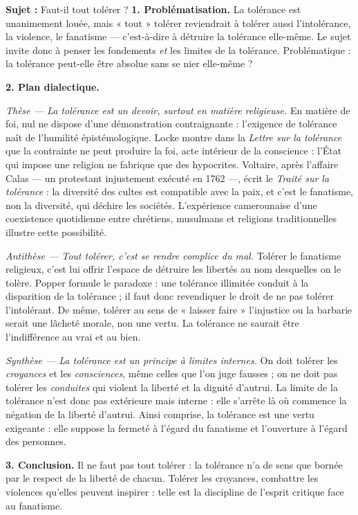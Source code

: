 \documentclass[11pt]{article}
\begin{document}
\begin{exoresolu}
\textbf{Sujet :} Faut-il tout tolérer ?
\tcblower
\textbf{1. Problématisation.} La tolérance est unanimement louée, mais « tout » tolérer reviendrait à tolérer aussi l'intolérance, la violence, le fanatisme — c'est-à-dire à détruire la tolérance elle-même. Le sujet invite donc à penser les fondements \emph{et} les limites de la tolérance. Problématique : la tolérance peut-elle être absolue sans se nier elle-même ?

\textbf{2. Plan dialectique.}

\emph{Thèse — La tolérance est un devoir, surtout en matière religieuse.} En matière de foi, nul ne dispose d'une démonstration contraignante : l'exigence de tolérance naît de l'humilité épistémologique. Locke montre dans la \emph{Lettre sur la tolérance} que la contrainte ne peut produire la foi, acte intérieur de la conscience : l'État qui impose une religion ne fabrique que des hypocrites. Voltaire, après l'affaire Calas — un protestant injustement exécuté en 1762 —, écrit le \emph{Traité sur la tolérance} : la diversité des cultes est compatible avec la paix, et c'est le fanatisme, non la diversité, qui déchire les sociétés. L'expérience camerounaise d'une coexistence quotidienne entre chrétiens, musulmans et religions traditionnelles illustre cette possibilité.

\emph{Antithèse — Tout tolérer, c'est se rendre complice du mal.} Tolérer le fanatisme religieux, c'est lui offrir l'espace de détruire les libertés au nom desquelles on le tolère. Popper formule le paradoxe : une tolérance illimitée conduit à la disparition de la tolérance ; il faut donc revendiquer le droit de ne pas tolérer l'intolérant. De même, tolérer au sens de « laisser faire » l'injustice ou la barbarie serait une lâcheté morale, non une vertu. La tolérance ne saurait être l'indifférence au vrai et au bien.

\emph{Synthèse — La tolérance est un principe à limites internes.} On doit tolérer les \emph{croyances} et les \emph{consciences}, même celles que l'on juge fausses ; on ne doit pas tolérer les \emph{conduites} qui violent la liberté et la dignité d'autrui. La limite de la tolérance n'est donc pas extérieure mais interne : elle s'arrête là où commence la négation de la liberté d'autrui. Ainsi comprise, la tolérance est une vertu exigeante : elle suppose la fermeté à l'égard du fanatisme et l'ouverture à l'égard des personnes.

\textbf{3. Conclusion.} Il ne faut pas tout tolérer : la tolérance n'a de sens que bornée par le respect de la liberté de chacun. Tolérer les croyances, combattre les violences qu'elles peuvent inspirer : telle est la discipline de l'esprit critique face au fanatisme.
\end{exoresolu}
\end{document}
